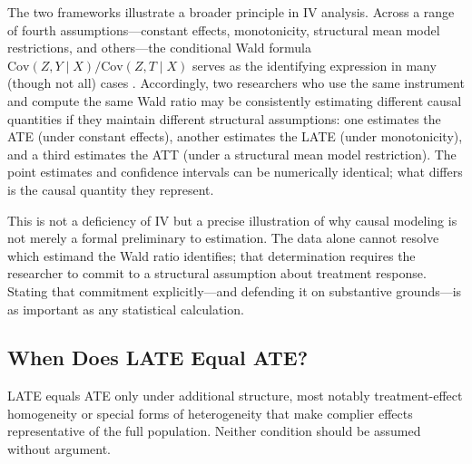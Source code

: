 \documentclass[master.tex]{subfiles}
\begin{document}
\begin{remark}
\label{w7:rem:same-formula}
The two frameworks illustrate a broader principle in IV analysis.
Across a range of fourth assumptions---constant effects, monotonicity,
structural mean model restrictions, and others---the conditional Wald
formula $\mathrm{Cov}(Z, Y \mid X)/\mathrm{Cov}(Z, T \mid X)$ serves
as the identifying expression in many (though not all) cases
\citep{levis2024nonparametric}.  Accordingly, two researchers who use
the same instrument and compute the same Wald ratio may be consistently
estimating different causal quantities if they maintain different
structural assumptions: one estimates the ATE (under constant effects),
another estimates the LATE (under monotonicity), and a third estimates
the ATT (under a structural mean model restriction).  The point
estimates and confidence intervals can be numerically identical; what
differs is the causal quantity they represent.

This is not a deficiency of IV but a precise illustration of why
causal modeling is not merely a formal preliminary to estimation.  The
data alone cannot resolve which estimand the Wald ratio identifies;
that determination requires the researcher to commit to a structural
assumption about treatment response.  Stating that commitment
explicitly---and defending it on substantive grounds---is as important
as any statistical calculation.
\end{remark}

\subsection{When Does LATE Equal ATE?}

LATE equals ATE only under additional structure, most notably
treatment-effect homogeneity or special forms of heterogeneity
that make complier effects representative of the full population.
Neither condition should be assumed without argument.
\end{document}

